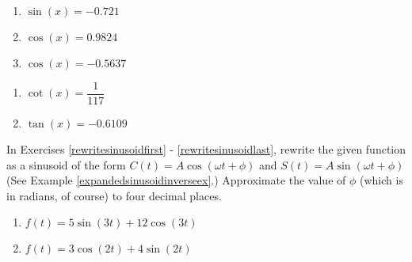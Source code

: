 \begin{multicols}{3}

\begin{enumerate}

\setcounter{enumi}{\value{HW}}

\item $\sin(x) = -0.721$
\item $\cos(x) = 0.9824$
\item $\cos(x) = -0.5637$

\setcounter{HW}{\value{enumi}}

\end{enumerate}

\end{multicols}

\begin{multicols}{3}

\begin{enumerate}

\setcounter{enumi}{\value{HW}}

\item $\cot(x) = \dfrac{1}{117}$
\item $\tan(x) = -0.6109$  \label{equarctriglast}

\setcounter{HW}{\value{enumi}}

\end{enumerate}

\end{multicols}


In Exercises \ref{rewritesinusoidfirst} - \ref{rewritesinusoidlast}, rewrite the given function as a sinusoid of the form $C(t) = A \cos(\omega t + \phi)$ and $S(t) = A\sin(\omega t + \phi)$ (See Example \ref{expandedsinusoidinverseex}.)  Approximate the value of $\phi$ (which is in radians, of course) to four decimal places.

\begin{multicols}{2}

\begin{enumerate}

\setcounter{enumi}{\value{HW}}

\item $f(t) = 5\sin(3t) + 12\cos(3t)$ \label{rewritesinusoidfirst}
\item $f(t) = 3\cos(2t) + 4\sin(2t)$

\setcounter{HW}{\value{enumi}}

\end{enumerate}

\end{multicols}

